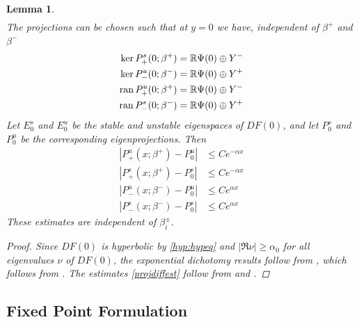 \documentclass[10pt,reqno]{amsart}
\theoremstyle{plain}
\newtheorem{lemma}[theorem]{Lemma}
\theoremstyle{definition}
\theoremstyle{remark}
\numberwithin{theorem}{section}
\numberwithin{equation}{section}
\begin{document}
\begin{lemma}
\begin{align*}
\end{align*}
The projections can be chosen such that at $y = 0$ we have, independent of $\beta^+$ and $\beta^-$
\begin{align*}
\mathop\mathrm{ker}\nolimits P^s_+(0; \beta^+) &= \mathbb{R} \Psi(0) \oplus Y^- \\
\mathop\mathrm{ker}\nolimits P^u_-(0; \beta^-) &= \mathbb{R} \Psi(0) \oplus Y^+ \\
\operatorname{ran} P^u_+(0; \beta^+) &= \mathbb{R} \Psi(0) \oplus Y^- \\
\operatorname{ran} P^s_-(0; \beta^-) &= \mathbb{R} \Psi(0) \oplus Y^+
\end{align*}
Let $E_0^s$ and $E_0^u$ be the stable and unstable eigenspaces of $DF(0)$, and let $P_0^s$ and $P_0^u$ be the corresponding eigenprojections. Then
\begin{equation}\label{projdiffest}
\begin{aligned}
|P^u_+(x; \beta^+) - P_0^u| &\leq C e^{-\alpha x} \\
|P^s_+(x; \beta^+) - P_0^s| &\leq C e^{-\alpha x} \\
|P^u_-(x; \beta^-) - P_0^u| &\leq C e^{\alpha x} \\
|P^s_-(x; \beta^-) - P_0^s| &\leq C e^{\alpha x} 
\end{aligned}
\end{equation}
These estimates are independent of $\beta_i^\pm$.

\begin{proof}
Since $DF(0)$ is hyperbolic by \cref{hyp:hypeq} and $|\Re \nu| \geq \alpha_0$ for all eigenvalues $\nu$ of $DF(0)$, the exponential dichotomy results follow from \cite[Lemma 5.1]{Sandstede1997}, which follows from \cite[Lemma 1.1]{Sandstede1993}. The estimates \cref{projdiffest} follow from \cite[Lemma 1.1]{Sandstede1993} and \cite[Lemma 2.1]{Sandstede1993}.
\end{proof}
\end{lemma}

\subsection{Fixed Point Formulation}
\end{document}
